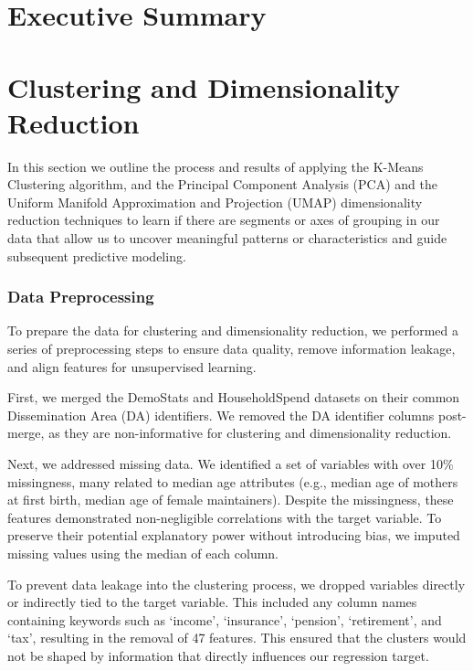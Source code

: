 \documentclass{article}
\begin{document}
\tableofcontents	

\section{Executive Summary}

\section{Clustering and Dimensionality Reduction}
In this section we outline the process and results of applying the K-Means Clustering algorithm, and the Principal Component Analysis (PCA) and the Uniform Manifold Approximation and Projection (UMAP) dimensionality reduction techniques to learn if there are segments or axes of grouping in our data that allow us to uncover meaningful patterns or characteristics and guide subsequent predictive modeling.

\subsubsection{Data Preprocessing}

To prepare the data for clustering and dimensionality reduction, we performed a series of preprocessing steps to ensure data quality, remove information leakage, and align features for unsupervised learning.

First, we merged the DemoStats and HouseholdSpend datasets on their common Dissemination Area (DA) identifiers. We removed the DA identifier columns post-merge, as they are non-informative for clustering and dimensionality reduction.

Next, we addressed missing data. We identified a set of variables with over 10\% missingness, many related to median age attributes (e.g., median age of mothers at first birth, median age of female maintainers). Despite the missingness, these features demonstrated non-negligible correlations with the target variable. To preserve their potential explanatory power without introducing bias, we imputed missing values using the median of each column.

To prevent data leakage into the clustering process, we dropped variables directly or indirectly tied to the target variable. This included any column names containing keywords such as ‘income’, ‘insurance’, ‘pension’, ‘retirement’, and ‘tax’, resulting in the removal of 47 features. This ensured that the clusters would not be shaped by information that directly influences our regression target.
\end{document}
